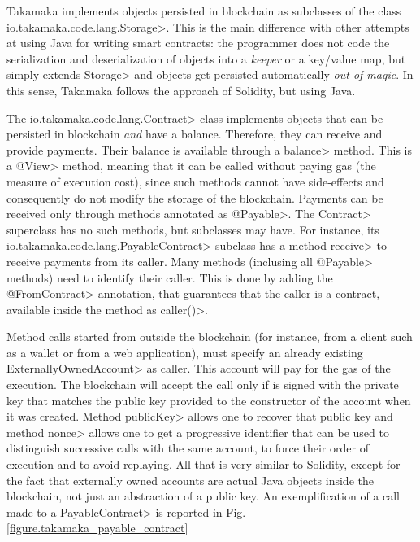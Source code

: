 Takamaka implements objects persisted in blockchain as subclasses of the class
\<io.takamaka.code.lang.Storage>.
This is the main difference with other attempts at using Java for writing smart contracts:
the programmer does not code the serialization and deserialization of objects into
a \emph{keeper} or a key/value map, but simply extends \<Storage> and objects get
persisted automatically \emph{out of magic}. In this sense, Takamaka follows the approach of
Solidity, but using Java.

The \<io.takamaka.code.lang.Contract> class implements objects that can be
persisted in blockchain \emph{and} have a balance. Therefore, they can receive and provide payments.
Their balance is available through a \<balance> method. This is a \<@View> method, meaning
that it can be called without paying gas (the measure of execution cost), since such methods
cannot have side-effects and consequently do not modify the storage of the blockchain.
Payments can be received only through methods annotated as \<@Payable>.
The \<Contract> superclass has no such methods, but subclasses may have.
For instance, its \<io.takamaka.code.lang.PayableContract> subclass has
a method \<receive> to receive payments from its caller. Many methods (inclusing all
\<@Payable> methods) need to identify their caller. This is done by adding the
\<@FromContract> annotation, that guarantees that the caller is a contract, available
inside the method as \<caller()>.

Method calls started from outside the blockchain (for instance, from a client such as a wallet
or from a web application), must specify an already existing \<ExternallyOwnedAccount>
as caller. This account will pay for the gas of the execution. The blockchain will accept
the call only if is signed with the private key that matches the public key provided to
the constructor of the account when it was created. Method \<publicKey> allows one to
recover that public key and method \<nonce> allows one to get a progressive identifier that
can be used to distinguish successive calls with the same account, to force their order
of execution and to avoid replaying.
All that is very similar to Solidity, except for the fact that externally owned accounts
are actual Java objects inside the blockchain, not just an abstraction of a public key. An exemplification of a call made to a \<PayableContract> is reported in Fig.\,\ref{figure.takamaka_payable_contract}

